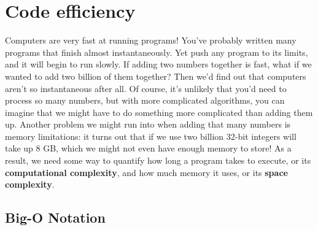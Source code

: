 \section{Code efficiency}

Computers are very fast at running programs! You've probably written many programs that finish almost instantaneously. Yet push any program to its limits, and it will begin to run slowly. If adding two numbers together is fast, what if we wanted to add two billion of them together? Then we'd find out that computers aren't so instantaneous after all. Of course, it's unlikely that you'd need to process so many numbers, but with more complicated algorithms, you can imagine that we might have to do something more complicated than adding them up. Another problem we might run into when adding that many numbers is memory limitations: it turns out that if we use two billion 32-bit integers will take up 8 GB, which we might not even have enough memory to store! As a result, we need some way to quantify how long a program takes to execute, or its \textbf{computational complexity}, and how much memory it uses, or its \textbf{space complexity}.


\subsection{Big-O Notation}

